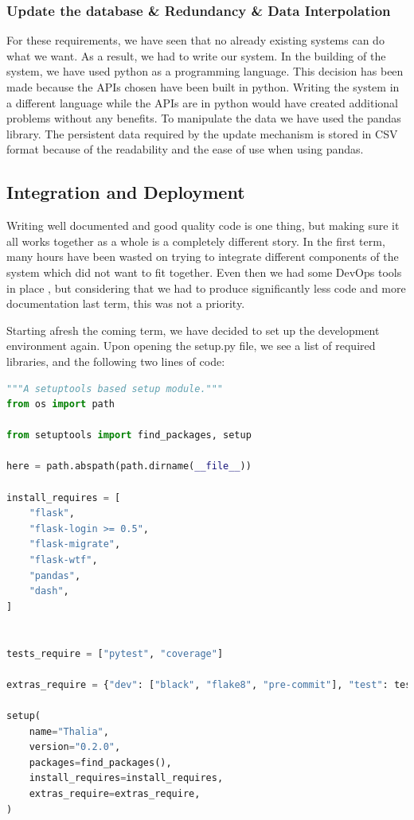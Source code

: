 \subsubsection*{Update the database \& Redundancy \& Data Interpolation}   
For these requirements, we have seen that no already existing systems can do what we want. As a result, we had to write our system.
In the building of the system, we have used python as a programming language. This decision has been made because the APIs chosen have been built in python. Writing the system in a different language while the APIs are in python would have created additional problems without any benefits.  To manipulate the data we have used the pandas library. The persistent data required by the update mechanism is stored in CSV \cite{csv_iso} format because of the readability and the ease of use when using pandas.

\subsection{Integration and Deployment}
\label{Coding Standards}

 Writing well documented and good quality code is one thing, but making sure it all works together as a whole is a completely different story. In the first term, many hours have been wasted on trying to integrate different components of the system which did not want to fit together. Even then we had some DevOps tools in place \cite{DevOps}, but considering that we had to produce significantly less code and more documentation last term, this was not a priority.

 Starting afresh the coming term, we have decided to set up the development environment again. Upon opening the setup.py file, we see a list of required libraries, and the following two lines of code:

\begin{lstlisting}[language=Python, caption=setup.py - Development environment, label=lst:Development_env]
"""A setuptools based setup module."""
from os import path

from setuptools import find_packages, setup

here = path.abspath(path.dirname(__file__))

install_requires = [
    "flask",
    "flask-login >= 0.5",
    "flask-migrate",
    "flask-wtf",
    "pandas",
    "dash",
]


tests_require = ["pytest", "coverage"]

extras_require = {"dev": ["black", "flake8", "pre-commit"], "test": tests_require}

setup(
    name="Thalia",
    version="0.2.0",
    packages=find_packages(),
    install_requires=install_requires,
    extras_require=extras_require,
)
\end{lstlisting}

